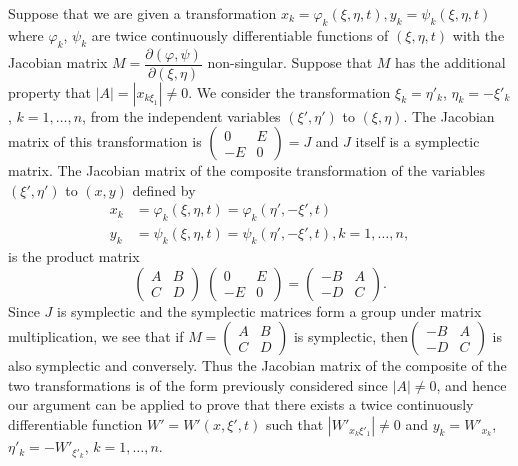 Suppose that we are given a transformation $x_k = \varphi_k(\xi, \eta, t), y_k = \psi_k (\xi, \eta, t)$ where $\varphi_k$, $\psi_k$ are twice continuously differentiable functions of $(\xi, \eta, t)$ with the Jacobian matrix $M = \dfrac{\partial (\varphi, \psi)}{\partial (\xi, \eta)}$ non-singular. Suppose that $M$ has the additional property that $|A| = |x_{k\xi_1}| \neq 0$. We consider the transformation $\xi_k = \eta'_k$, $\eta_k = - \xi'_k$, $k=1, \ldots, n$, from the independent variables $(\xi', \eta')$ to $(\xi, \eta)$. The Jacobian matrix of this transformation is $\left(\begin{smallmatrix}
0 & E \\ -E & 0\end{smallmatrix} \right) = J$ and $J$ itself is a symplectic matrix. The Jacobian matrix of the composite transformation of the variables $(\xi', \eta')$ to $(x,y)$ defined by
\begin{align*}
x_k & = \varphi_k (\xi, \eta, t) = \varphi_k (\eta' , - \xi', t)\\
y_k & = \psi_k (\xi, \eta, t) = \psi_k (\eta', - \xi',t), k =1, \ldots, n,
\end{align*}
is the product matrix 
$$
\begin{pmatrix}
A & B \\
C & D
\end{pmatrix} \; 
\begin{pmatrix}
0 & E\\
-E & 0
\end{pmatrix}
 = 
\begin{pmatrix}
-B & A \\
-D & C
\end{pmatrix}.
$$
Since $J$ is symplectic and the symplectic matrices form a group under matrix multiplication, we see that if $M = \left(\begin{smallmatrix}
A & B \\ C & D\end{smallmatrix}\right)$ is symplectic, then\pageoriginale $\left(\begin{smallmatrix} 
-B & A \\ -D & C\end{smallmatrix}\right)$ is also  symplectic and conversely. Thus the Jacobian matrix of the composite of the two transformations is of the form previously considered since $|A| \neq 0$, and hence our argument can be applied to prove that there exists a twice continuously differentiable function $W' = W' (x, \xi' , t)$ such that $|W'_{x_k \xi'_1}| \neq 0$ and $y_k = W'_{x_k}$, $\eta'_k = - W'_{\xi'_k}$, $k = 1, \ldots, n$. 

